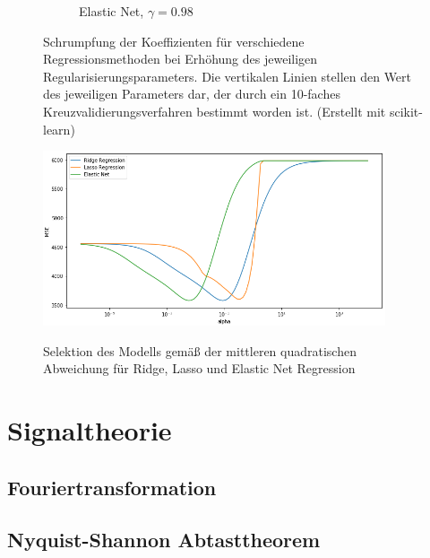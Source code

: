 \begin{figure}
\begin{subfigure}{0.9\textwidth}
	\label{elastic_net_coefficients}
	\vspace{-0.5cm}
	\caption{Elastic Net, $\gamma = 0.98$}
	\end{subfigure}
\caption{Schrumpfung der Koeffizienten für verschiedene Regressionsmethoden bei Erhöhung des jeweiligen Regularisierungsparameters. Die vertikalen Linien stellen den Wert des jeweiligen Parameters dar, der durch ein 10-faches Kreuzvalidierungsverfahren bestimmt worden ist. (Erstellt mit scikit-learn)}
\label{regression_coefficients}
\end{figure}

\begin{figure}
\centering
\includegraphics[width=0.9\textwidth]{figures/regression_coefficients_mse.png}
\label{regression_coefficients_mse}
\caption{Selektion des Modells gemäß der mittleren quadratischen Abweichung für Ridge, Lasso und Elastic Net Regression}
\end{figure}




\section{Signaltheorie}
\label{signal_processing}

\subsection{Fouriertransformation}
\subsection{Nyquist-Shannon Abtasttheorem}